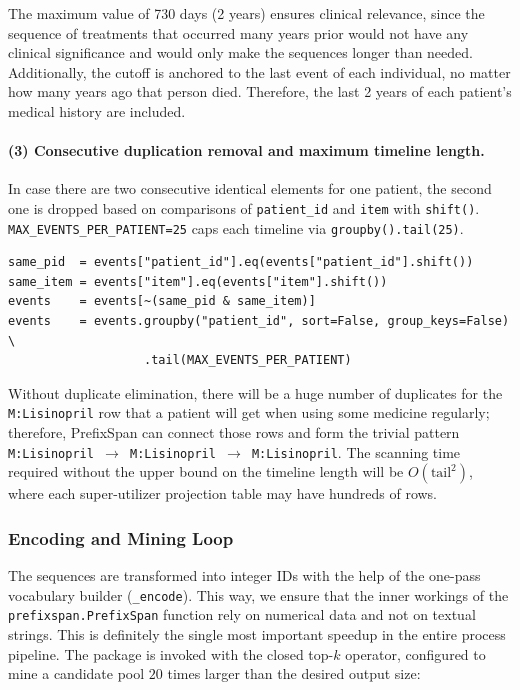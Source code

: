\noindent The maximum value of 730 days (2 years) ensures clinical relevance, since the sequence of treatments that occurred many years prior would not have any clinical significance and would only make the sequences longer than needed. Additionally, the cutoff is anchored to the last event of each individual, no matter how many years ago that person died. Therefore, the last 2 years of each patient’s medical history are included.

\paragraph{(3) Consecutive duplication removal and maximum timeline length.} In case there are two consecutive identical elements for one patient, the second one is dropped based on comparisons of \texttt{patient\_id} and \texttt{item} with \texttt{shift()}. \texttt{MAX\_EVENTS\_PER\_PATIENT=25} caps each timeline via \texttt{groupby().tail(25)}.

\begin{lstlisting}[style=pythonstyle]
same_pid  = events["patient_id"].eq(events["patient_id"].shift())
same_item = events["item"].eq(events["item"].shift())
events    = events[~(same_pid & same_item)]
events    = events.groupby("patient_id", sort=False, group_keys=False) \
                   .tail(MAX_EVENTS_PER_PATIENT)
\end{lstlisting}

\noindent Without duplicate elimination, there will be a huge number of duplicates for the \texttt{M:Lisinopril} row that a patient will get when using some medicine regularly; therefore, PrefixSpan can connect those rows and form the trivial pattern \texttt{M:Lisinopril \(\rightarrow\) M:Lisinopril \(\rightarrow\) M:Lisinopril}. The scanning time required without the upper bound on the timeline length will be \(O(\text{tail}^2)\), where each super-utilizer projection table may have hundreds of rows.

\subsubsection*{Encoding and Mining Loop}

The sequences are transformed into integer IDs with the help of the one-pass vocabulary builder (\texttt{\_encode}). This way, we ensure that the inner workings of the \texttt{prefixspan.PrefixSpan} function rely on numerical data and not on textual strings. This is definitely the single most important speedup in the entire process pipeline. The package is invoked with the closed top-\(k\) operator, configured to mine a candidate pool \(20\) times larger than the desired output size:

